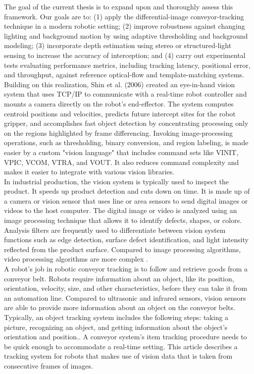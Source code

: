 \documentclass[12pt]{article}
\begin{document}
The goal of the current thesis is to expand upon and thoroughly assess this framework.  Our goals are to: (1) apply the differential-image conveyor-tracking technique in a modern robotic setting; (2) improve robustness against changing lighting and background motion by using adaptive thresholding and background modeling; (3) incorporate depth estimation using stereo or structured-light sensing to increase the accuracy of interception; and (4) carry out experimental tests evaluating performance metrics, including tracking latency, positional error, and throughput, against reference optical-flow and template-matching systems\cite{ref12}.\\

Building on this realization, Shin et al. (2006) created an eye-in-hand vision system that uses TCP/IP to communicate with a real-time robot controller and mounts a camera directly on the robot's end-effector.  The system computes centroid positions and velocities, predicts future intercept sites for the robot gripper, and accomplishes fast object detection by concentrating processing only on the regions highlighted by frame differencing.  Invoking image-processing operations, such as thresholding, binary conversion, and region labeling, is made easier by a custom "vision language" that includes command sets like VINIT, VPIC, VCOM, VTRA, and VOUT. It also reduces command complexity and makes it easier to integrate with various vision libraries\cite{ref12}.\\


In industrial production, the vision system is typically used to inspect the product.  It speeds up product detection and cuts down on time.  It is made up of a camera or vision sensor that uses line or area sensors to send digital images or videos to the host computer.  The digital image or video is analyzed using an image processing technique that allows it to identify defects, shapes, or colors.  Analysis filters are frequently used to differentiate between vision system functions such as edge detection, surface defect identification, and light intensity reflected from the product surface.  Compared to image processing algorithms, video processing algorithms are more complex \cite{ref12}.\\

A robot's job in robotic conveyor tracking is to follow and retrieve goods from a conveyor belt. Robots require information about an object, like its position, orientation, velocity, size, and other characteristics, before they can take it from an automation line. Compared to ultrasonic and infrared sensors, vision sensors are able to provide more information about an object on the conveyor belts. Typically, an object tracking system includes the following steps: taking a picture, recognizing an object, and getting information about the object's orientation and position.. A conveyor system's item tracking procedure needs to be quick enough to accommodate a real-time setting. This article describes a tracking system for robots that makes use of vision data that is taken from consecutive frames of images\cite{ref12}.\\
\end{document}
